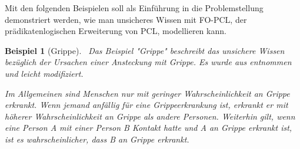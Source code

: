 \documentclass[draft]{scrreprt}
\newtheorem{Bsp}{Beispiel}[section]
\begin{document}
Mit den folgenden Beispielen soll als Einführung in die Problemstellung demonstriert werden, wie man unsicheres Wissen mit FO-PCL, der prädikatenlogischen Erweiterung von PCL, modellieren kann.

\begin{Bsp}[Grippe]\label{sec:Bsp1}\
Das Beispiel "{}Grippe"{} beschreibt das unsichere Wissen bezüglich der Ursachen einer Ansteckung mit Grippe. Es wurde aus \cite[Bsp. 6.2.7, S. 128/129]{Fis10} entnommen und leicht modifiziert.

Im Allgemeinen sind Menschen nur mit geringer Wahrscheinlichkeit an Grippe erkrankt. Wenn jemand anfällig für eine Grippeerkrankung ist, erkrankt er mit höherer Wahrscheinlichkeit an Grippe als andere Personen. Weiterhin gilt, wenn eine Person A mit einer Person B Kontakt hatte und A an Grippe erkrankt ist, ist es wahrscheinlicher, dass B an Grippe erkrankt. 


\end{Bsp}
\end{document}
